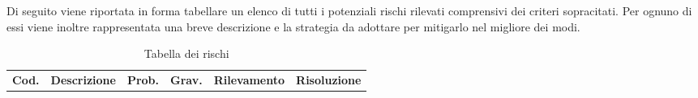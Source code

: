 Di seguito viene riportata in forma tabellare un elenco di tutti i potenziali rischi rilevati comprensivi dei criteri sopracitati. Per ognuno di essi viene inoltre rappresentata una breve descrizione e la strategia da adottare per mitigarlo nel migliore dei modi.
{
        \renewcommand{\arraystretch}{1.5}
        
        \begin{longtable}{|p{1cm}|p{3cm}|p{1cm}|p{1cm}|p{3cm}|p{3cm}|}
        \caption{Tabella dei rischi}\\
        \rowcolor{\primaryColor}
        \textcolor{\secondaryColor}{\textbf{Cod.}} & 
        \textcolor{\secondaryColor}{\textbf{Descrizione}} & 
        \textcolor{\secondaryColor}{\textbf{Prob.}} & 
        \textcolor{\secondaryColor}{\textbf{Grav.}} & 
        \textcolor{\secondaryColor}{\textbf{Rilevamento}} &
        \textcolor{\secondaryColor}{\textbf{Risoluzione}}\\
       

\end{longtable}}
